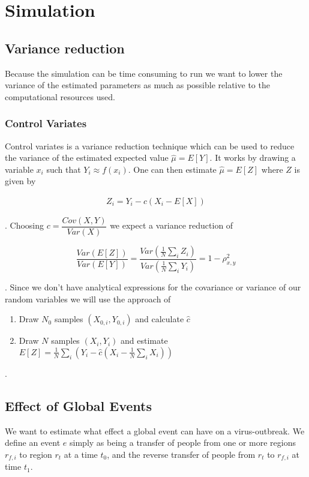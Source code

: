 \section{Simulation}
\subsection{Variance reduction}
Because the simulation can be time consuming to run we want to lower the variance of the estimated parameters as much as possible relative to the computational resources used. 

\subsubsection{Control Variates}
Control variates is a variance reduction technique which can be used to reduce the variance of the estimated expected value $\hat{\mu} =E[Y]$. It works by drawing a variable $x_i$ such that $Y_i \approx f(x_i)$. One can then estimate $\hat{\mu} =E[Z]$ where $Z$ is given by

\begin{align}
Z_i = Y_i - c (X_i - E[X]) 
\end{align}

. Choosing $c = \dfrac{Cov(X, Y)}{Var(X)}$ we expect a variance reduction of

\begin{equation}
\frac{Var(E[Z])}{Var(E[Y])} = \frac{ Var(\frac{1}{N} \sum_i Z_i) }{ Var(\frac{1}{N} \sum_i Y_i )} = 1 - \rho_{x, y}^2
\end{equation}

. Since we don't have analytical expressions for the covariance or variance of our random variables we will use the approach of

\begin{enumerate}
	\item Draw $N_0$ samples $(X_{0,i}, Y_{0, i})$ and calculate $\hat{c}$
	\item Draw $N$ samples $(X_i, Y_i)$ and estimate $E[Z] = \frac{1}{N} \sum_i \left( Y_i - \hat{c} (X_i - \frac{1}{N}\sum_i X_i) \right)  $
\end{enumerate}

.

\subsection{Effect of Global Events}
We want to estimate what effect a global event can have on a virus-outbreak. We define an event $e$ simply as being a transfer of people from one or more regions $r_{f, i}$ to region $r_t$ at a time $t_0$, and the reverse transfer of people from $r_t$ to $r_{f, i}$ at time $t_1$.

